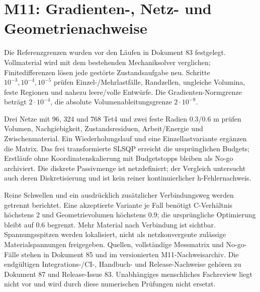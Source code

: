 \chapter{M11: Gradienten-, Netz- und Geometrienachweise}\label{vv:topology}
Die Referenzgrenzen wurden vor den Läufen in Dokument 83 festgelegt.
Vollmaterial wird mit dem bestehenden Mechaniksolver verglichen;
Finitedifferenzen lösen jede gestörte Zustandsaufgabe neu. Schritte
\(10^{-3},10^{-4},10^{-5}\) prüfen Einzel-/Mehrlastfälle, Randzellen,
ungleiche Volumina, feste Regionen und nahezu leere/volle Entwürfe.
Die Gradienten-Normgrenze beträgt \(2\cdot10^{-4}\), die absolute
Volumenableitungsgrenze \(2\cdot10^{-9}\).

Drei Netze mit 96, 324 und 768 Tet4 und zwei feste Radien 0.3/0.6 m
prüfen Volumen, Nachgiebigkeit, Zustandsresiduen, Arbeit/Energie und
Zwischenmaterial. Ein Wiederholungslauf und eine Einzellastvariante ergänzen
die Matrix. Das frei transformierte SLSQP erreicht die ursprünglichen Budgets;
Erstläufe ohne Koordinatenskalierung mit Budgetstopps bleiben als No-go
archiviert. Die diskrete Passivmenge ist netzdefiniert; der Vergleich untersucht
auch deren Diskretisierung und ist kein reiner kontinuierlicher h-Fehlernachweis.

Reine Schwellen und ein ausdrücklich zusätzlicher Verbindungsweg werden
getrennt berichtet. Eine akzeptierte Variante je Fall benötigt C-Verhältnis
höchstens 2 und Geometrievolumen höchstens 0.9; die ursprüngliche Optimierung
bleibt auf 0.6 begrenzt. Mehr Material nach Verbindung ist sichtbar.
Spannungsspitzen werden lokalisiert, nicht als netzkonvergente zulässige
Materialspannungen freigegeben. Quellen, vollständige Messmatrix und No-go-Fälle
stehen in Dokument 85 und im versionierten M11-Nachweisarchiv.
Die endgültigen Integrations-/CI-, Handbuch- und Release-Nachweise gehören
zu Dokument 87 und Release-Issue 83. Unabhängiges menschliches Fachreview liegt
nicht vor und wird durch diese numerischen Prüfungen nicht ersetzt.
